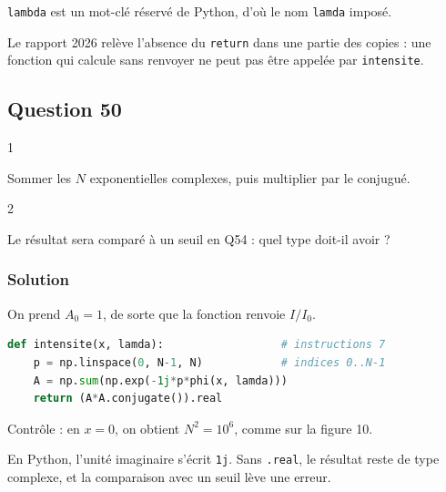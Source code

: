 \documentclass[11pt,a4paper]{article}
\begin{document}
\texttt{lambda} est un mot-clé réservé de Python, d'où le nom \texttt{lamda} imposé.

\begin{piege}

Le rapport 2026 relève l'absence du \texttt{return} dans une partie des copies : une fonction qui calcule sans renvoyer ne peut pas être appelée par \texttt{intensite}.

\end{piege}

\hypertarget{question-50}{%
\subsection{Question 50}\label{question-50}}

\begin{indication}{1}

Sommer les \(N\) exponentielles complexes, puis multiplier par le conjugué.

\end{indication}

\begin{indication}{2}

Le résultat sera comparé à un seuil en Q54 : quel type doit-il avoir ?

\end{indication}

\hypertarget{solution-49}{%
\subsubsection{Solution}\label{solution-49}}

On prend \(A_0=1\), de sorte que la fonction renvoie \(I/I_0\).

\begin{lstlisting}[language=Python]
def intensite(x, lamda):                  # instructions 7
    p = np.linspace(0, N-1, N)            # indices 0..N-1
    A = np.sum(np.exp(-1j*p*phi(x, lamda)))
    return (A*A.conjugate()).real
\end{lstlisting}

Contrôle : en \(x=0\), on obtient \(N^2=10^6\), comme sur la figure 10.

\begin{piege}

En Python, l'unité imaginaire s'écrit \texttt{1j}. Sans \texttt{.real}, le résultat reste de type complexe, et la comparaison avec un seuil lève une erreur.

\end{piege}
\end{document}
